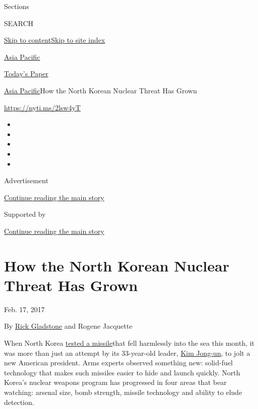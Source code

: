 Sections

SEARCH

\protect\hyperlink{site-content}{Skip to
content}\protect\hyperlink{site-index}{Skip to site index}

\href{https://www.nytimes3xbfgragh.onion/section/world/asia}{Asia
Pacific}

\href{https://myaccount.nytimes3xbfgragh.onion/auth/login?response_type=cookie\&client_id=vi}{}

\href{https://www.nytimes3xbfgragh.onion/section/todayspaper}{Today's
Paper}

\href{/section/world/asia}{Asia Pacific}\textbar{}How the North Korean
Nuclear Threat Has Grown

\url{https://nyti.ms/2lsw4yT}

\begin{itemize}
\item
\item
\item
\item
\item
\end{itemize}

Advertisement

\protect\hyperlink{after-top}{Continue reading the main story}

Supported by

\protect\hyperlink{after-sponsor}{Continue reading the main story}

\hypertarget{how-the-north-korean-nuclear-threat-has-grown}{%
\section{How the North Korean Nuclear Threat Has
Grown}\label{how-the-north-korean-nuclear-threat-has-grown}}

Feb. 17, 2017

By \href{https://www.nytimes3xbfgragh.onion/by/rick-gladstone}{Rick
Gladstone} and Rogene Jacquette

When North Korea
\href{https://www.nytimes3xbfgragh.onion/2017/02/11/world/asia/north-korea-missile-test-trump.html}{tested
a missile}that fell harmlessly into the sea this month, it was more than
just an attempt by its 33-year-old leader,
\href{https://www.nytimes3xbfgragh.onion/topic/person/kim-jongun}{Kim
Jong-un}, to jolt a new American president. Arms experts observed
something new: solid-fuel technology that makes such missiles easier to
hide and launch quickly. North Korea's nuclear weapons program has
progressed in four areas that bear watching: arsenal size, bomb
strength, missile technology and ability to elude detection.


